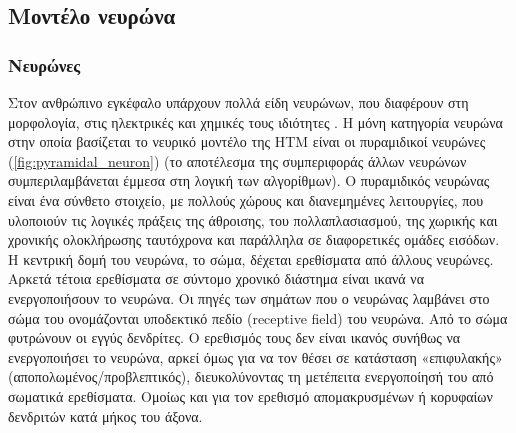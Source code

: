 \subsection{Μοντέλο νευρώνα} \label{htm:model_neuron}

	\subsubsection{Νευρώνες}

	Στον ανθρώπινο εγκέφαλο υπάρχουν πολλά είδη νευρώνων, που διαφέρουν στη μορφολογία, στις ηλεκτρικές και χημικές τους ιδιότητες \parencite{markramReconstructionSimulationNeocortical2015}.
	Η μόνη κατηγορία νευρώνα στην οποία βασίζεται το νευρικό μοντέλο της HTM είναι οι πυραμιδικοί νευρώνες (\ref{fig:pyramidal_neuron})
	(το αποτέλεσμα της συμπεριφοράς άλλων νευρώνων συμπεριλαμβάνεται έμμεσα στη λογική των αλγορίθμων).
	Ο πυραμιδικός νευρώνας είναι ένα σύνθετο στοιχείο, με πολλούς χώρους και διανεμημένες λειτουργίες, που υλοποιούν τις λογικές πράξεις της άθροισης,
	του πολλαπλασιασμού, της χωρικής και χρονικής ολοκλήρωσης ταυτόχρονα και παράλληλα σε διαφορετικές ομάδες εισόδων.
	Η κεντρική δομή του νευρώνα, το σώμα, δέχεται ερεθίσματα από άλλους νευρώνες.
	Αρκετά τέτοια ερεθίσματα σε σύντομο χρονικό διάστημα είναι ικανά να ενεργοποιήσουν το νευρώνα.
	Οι πηγές των σημάτων που ο νευρώνας λαμβάνει στο σώμα του ονομάζονται υποδεκτικό πεδίο (receptive field) του νευρώνα.
	Από το σώμα φυτρώνουν οι εγγύς δενδρίτες. Ο ερεθισμός τους δεν είναι ικανός συνήθως να ενεργοποιήσει το νευρώνα, αρκεί όμως για να τον θέσει
	σε κατάσταση «επιφυλακής» (αποπολωμένος/προβλεπτικός), διευκολύνοντας τη μετέπειτα ενεργοποίησή του από σωματικά ερεθίσματα.
	Ομοίως και για τον ερεθισμό απομακρυσμένων ή κορυφαίων δενδριτών κατά μήκος του άξονα.

